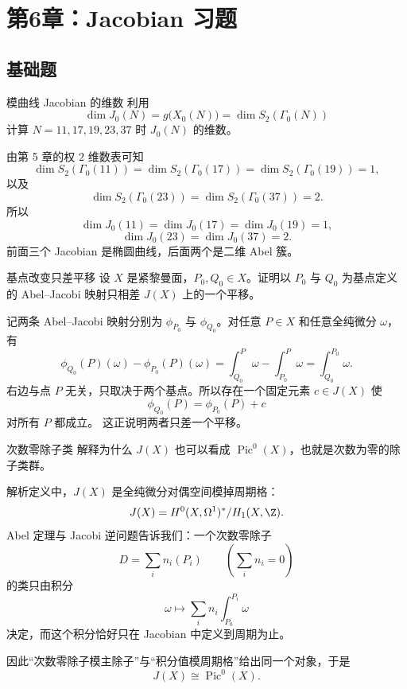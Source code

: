 \chapter{第6章：Jacobian 习题}
\difficultykey

\section{基础题 \easy}

\begin{problem}{模曲线 Jacobian 的维数}
\easy
利用
\[
\dim J_0(N)=g\bigl(X_0(N)\bigr)=\dim S_2(\Gamma_0(N))
\]
计算 $N=11,17,19,23,37$ 时 $J_0(N)$ 的维数。
\end{problem}
\begin{solution}
由第 5 章的权 $2$ 维数表可知
\[
\dim S_2(\Gamma_0(11))=
\dim S_2(\Gamma_0(17))=
\dim S_2(\Gamma_0(19))=1,
\]
以及
\[
\dim S_2(\Gamma_0(23))=
\dim S_2(\Gamma_0(37))=2.
\]
所以
\[
\dim J_0(11)=\dim J_0(17)=\dim J_0(19)=1,
\]
\[
\dim J_0(23)=\dim J_0(37)=2.
\]
前面三个 Jacobian 是椭圆曲线，后面两个是二维 Abel 簇。
\end{solution}

\begin{problem}{基点改变只差平移}
\easy
设 $X$ 是紧黎曼面，$P_0,Q_0\in X$。证明以 $P_0$ 与 $Q_0$ 为基点定义的 Abel--Jacobi 映射只相差 $J(X)$ 上的一个平移。
\end{problem}
\begin{solution}
记两条 Abel--Jacobi 映射分别为 $\phi_{P_0}$ 与 $\phi_{Q_0}$。对任意 $P\in X$ 和任意全纯微分 $\omega$，有
\[
\phi_{Q_0}(P)(\omega)-\phi_{P_0}(P)(\omega)=\int_{Q_0}^{P}\omega-\int_{P_0}^{P}\omega=\int_{Q_0}^{P_0}\omega.
\]
右边与点 $P$ 无关，只取决于两个基点。所以存在一个固定元素 $c\in J(X)$ 使
\[
\phi_{Q_0}(P)=\phi_{P_0}(P)+c
\]
对所有 $P$ 都成立。
这正说明两者只差一个平移。
\end{solution}

\begin{problem}{次数零除子类}
\easy
解释为什么 $J(X)$ 也可以看成 $\operatorname{Pic}^0(X)$，也就是次数为零的除子类群。
\end{problem}
\begin{solution}
解析定义中，$J(X)$ 是全纯微分对偶空间模掉周期格：
\[
J(X)=H^0(X,\Omega^1)^*/H_1(X,\Z).
\]
Abel 定理与 Jacobi 逆问题告诉我们：一个次数零除子
\[
D=\sum_i n_i(P_i)
\qquad \left(\sum_i n_i=0\right)
\]
的类只由积分
\[
\omega\longmapsto \sum_i n_i\int_{P_0}^{P_i}\omega
\]
决定，而这个积分恰好只在 Jacobian 中定义到周期为止。

因此“次数零除子模主除子”与“积分值模周期格”给出同一个对象，于是
\[
J(X)\cong \operatorname{Pic}^0(X).
\]
\end{solution}


